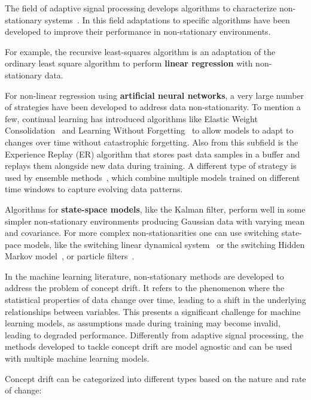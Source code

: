 \documentclass[12pt]{article}
\begin{document}
The field of adaptive signal processing develops algorithms to characterize
non-stationary systems~\citep{haykin02}. In this field adaptations to specific
algorithms have been developed to improve their performance in non-stationary
environments.

For example, the recursive least-squares algorithm \citep[][Chapter
9]{haykin02} is an adaptation of the ordinary least square algorithm to perform
\textbf{linear regression} with non-stationary data.

For non-linear regression using \textbf{artificial neural networks}, a very large number
of strategies have been developed to address data non-stationarity. To mention
a few, continual learning has introduced algorithms like  Elastic Weight
Consolidation~\citep[EWC][]{} and Learning Without Forgetting~\citep[LwF][]{}
to allow models to adapt to changes over time without catastrophic forgetting.
Also from this subfield is the Experience Replay (ER) algorithm that stores
past data samples in a buffer and replays them alongside new data during
training. A different type of strategy is used by ensemble methods~\citep{},
which combine multiple models trained on different time windows to capture
evolving data patterns.

Algorithms for \textbf{state-space models}, like the Kalman filter, perform well in some
simpler non-stationary environments producing Gaussian data with varying mean and
covariance.
%
For more complex non-stationarities one can use switching state-pace models,
like the switching linear dynamical system~\cite{} or the switching Hidden
Markov model~\cite{}, or particle filters~\citep{}.



In the machine learning literature, non-stationary methods are developed to
address the problem of concept drift. It refers to the phenomenon where the
statistical properties of data change over time, leading to a shift in the
underlying relationships between variables. This presents a significant
challenge for machine learning models, as assumptions made during training may
become invalid, leading to degraded performance.
%
Differently from adaptive signal processing, the methods developed to tackle
concept drift are model agnostic and can be used with multiple machine learning
models.

Concept drift can be categorized into different types based on the nature and
rate of change:
\end{document}
